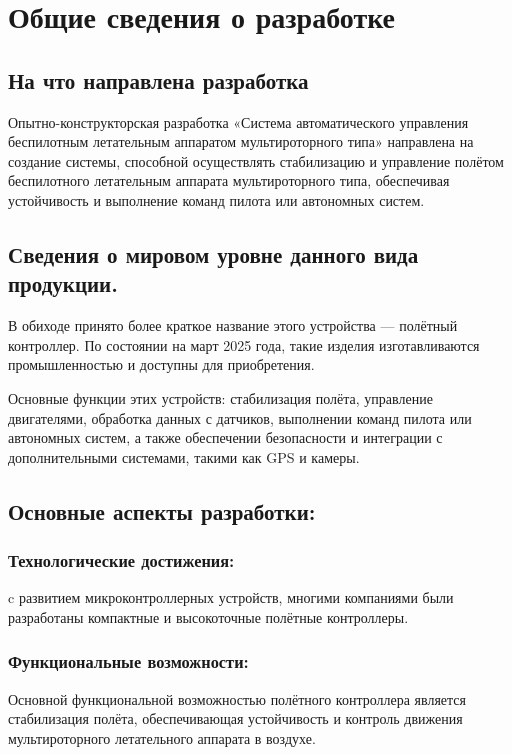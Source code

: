 \documentclass[a4paper]{bsuir-tor}
\begin{document}


\section{Общие сведения о разработке}

\subsection{На что направлена разработка \newline}

  Опытно-конструкторская разработка «Система автоматического
  управления беспилотным летательным аппаратом мультироторного типа»
  направлена на создание системы, способной осуществлять стабилизацию и
  управление полётом беспилотного летательным аппарата мультироторного
  типа, обеспечивая устойчивость и выполнение команд пилота или
  автономных систем.

  
  \subsection{Сведения о мировом уровне данного вида продукции. \newline}
  
  В обиходе принято более краткое название этого устройства — полётный
  контроллер.  По состоянии на март 2025 года, такие изделия
  изготавливаются промышленностью и доступны для приобретения.
    
  Основные функции этих устройств: стабилизация полёта, управление
  двигателями, обработка данных с датчиков, выполнении команд пилота или
  автономных систем, а также обеспечении безопасности и интеграции с
  дополнительными системами, такими как GPS и камеры.
  
  \subsection{Основные аспекты разработки: }
  
  \subsubsection{Технологические достижения: }
  c развитием микроконтроллерных устройств, многими компаниями были
  разработаны компактные и высокоточные полётные контроллеры.
  
  \subsubsection{Функциональные возможности: }
  Основной функциональной возможностью полётного контроллера является
  стабилизация полёта, обеспечивающая устойчивость и контроль движения
  мультироторного летательного аппарата в воздухе.
\end{document}
